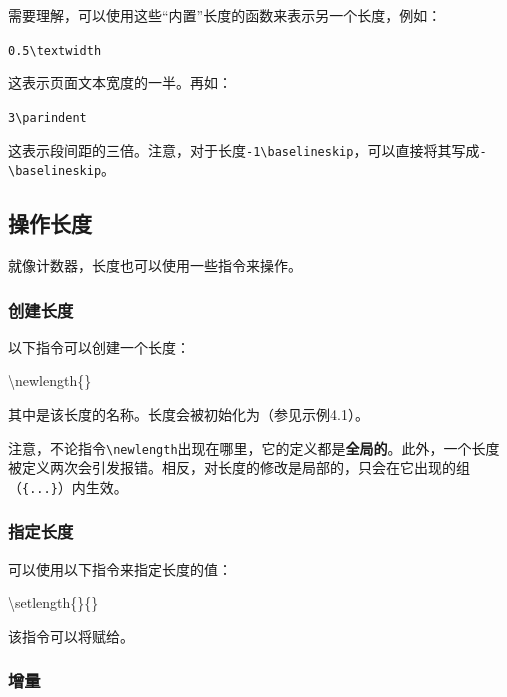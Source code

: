 需要理解，可以使用这些``内置''长度的函数来表示另一个长度，例如：

\begin{dmd}
\verb|0.5\textwidth|
\end{dmd}

这表示页面文本宽度的一半。再如：

\begin{dmd}
\verb|3\parindent|
\end{dmd}

这表示段间距的三倍。注意，对于长度\verb|-1\baselineskip|，可以直接将其写成\verb|-\baselineskip|。

\subsection{操作长度}

就像计数器，长度也可以使用一些指令来操作。

\subsubsection{创建长度}

以下指令可以创建一个长度：

\begin{dmd}
\backslash newlength\{\}
\end{dmd}

其中是该长度的名称。长度会被初始化为\dm{0pt}（参见示例4.1）。

\begin{exclamation}
注意，不论指令\verb|\newlength|出现在哪里，它的定义都是\textbf{全局的}。此外，一个长度被定义两次会引发报错。相反，对长度的修改是局部的，只会在它出现的组（\verb|{...}|）内生效。
\end{exclamation}

\subsubsection{指定长度}

可以使用以下指令来指定长度的值：

\begin{dmd}
\backslash setlength\{\}\{\}
\end{dmd}

该指令可以将赋给。

\subsubsection{增量}

